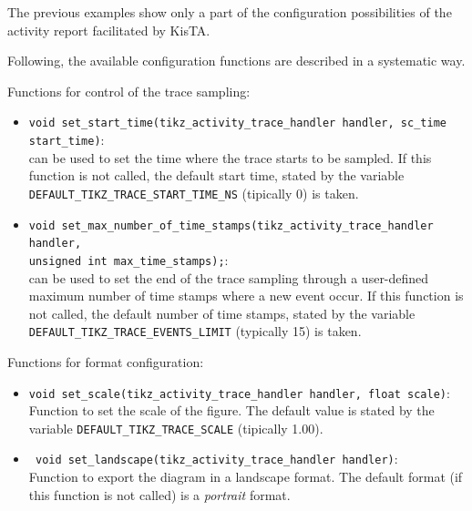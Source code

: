 The previous examples show only a part of the configuration possibilities of the activity report facilitated
by KisTA.

Following, the available configuration functions are described in a systematic way.

Functions for control of the trace sampling:
\begin{itemize}
\item \texttt{void set\_start\_time(tikz\_activity\_trace\_handler handler, sc\_time start\_time)}:\\
can be used to set the time where the trace starts to be sampled.
If this function is not called, the default start time, stated by the variable \texttt{DEFAULT\_TIKZ\_TRACE\_START\_TIME\_NS} (tipically 0) is taken.
\item \texttt{void set\_max\_number\_of\_time\_stamps(tikz\_activity\_trace\_handler handler, \\
 unsigned int max\_time\_stamps);}:
\\ can be used to set the end of the trace sampling through a user-defined maximum number of time stamps where a new event occur.
If this function is not called, the default number of time stamps, stated by the variable \texttt{DEFAULT\_TIKZ\_TRACE\_EVENTS\_LIMIT} (typically 15) is taken.
\end{itemize}

Functions for format configuration:
\begin{itemize}
\item \texttt{void set\_scale(tikz\_activity\_trace\_handler handler, float scale)}:\\
Function to set the scale of the figure. The default value is stated by the
variable \texttt{DEFAULT\_TIKZ\_TRACE\_SCALE} (tipically 1.00).
    
\item \texttt{ void set\_landscape(tikz\_activity\_trace\_handler handler)}:\\
Function to export the diagram in a landscape format.
The default format (if this function is not called) is a \emph{portrait} format.
\end{itemize}

